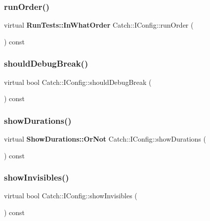 \mbox{\label{struct_catch_1_1_i_config_a0fc59c9aba1d4018538d5526daa5eb78}} 
\subsubsection{runOrder()}
{\footnotesize\ttfamily virtual \textbf{ Run\+Tests\+::\+In\+What\+Order} Catch\+::\+I\+Config\+::run\+Order (\begin{DoxyParamCaption}{ }\end{DoxyParamCaption}) const\hspace{0.3cm}{\ttfamily [pure virtual]}}

\mbox{\label{struct_catch_1_1_i_config_a5b886c5aad9001e90f63a7cf0726af63}} 
\subsubsection{shouldDebugBreak()}
{\footnotesize\ttfamily virtual bool Catch\+::\+I\+Config\+::should\+Debug\+Break (\begin{DoxyParamCaption}{ }\end{DoxyParamCaption}) const\hspace{0.3cm}{\ttfamily [pure virtual]}}

\mbox{\label{struct_catch_1_1_i_config_abaa97d281484278291f0d3db6d404aeb}} 
\subsubsection{showDurations()}
{\footnotesize\ttfamily virtual \textbf{ Show\+Durations\+::\+Or\+Not} Catch\+::\+I\+Config\+::show\+Durations (\begin{DoxyParamCaption}{ }\end{DoxyParamCaption}) const\hspace{0.3cm}{\ttfamily [pure virtual]}}

\mbox{\label{struct_catch_1_1_i_config_aa288bf92ccd0aafd85409d8aefdf738c}} 
\subsubsection{showInvisibles()}
{\footnotesize\ttfamily virtual bool Catch\+::\+I\+Config\+::show\+Invisibles (\begin{DoxyParamCaption}{ }\end{DoxyParamCaption}) const\hspace{0.3cm}{\ttfamily [pure virtual]}}

